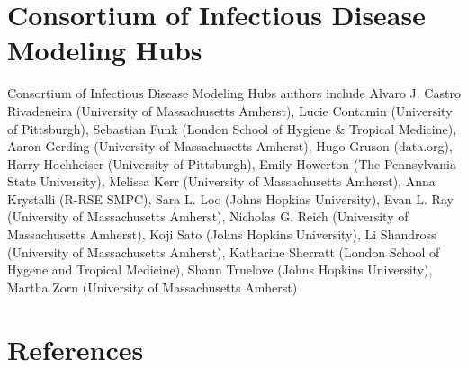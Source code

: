 \documentclass[
]{article}
\begin{document}
\section*{Consortium of Infectious Disease Modeling
Hubs}\label{consortium-of-infectious-disease-modeling-hubs}

Consortium of Infectious Disease Modeling Hubs authors include Alvaro J.
Castro Rivadeneira (University of Massachusetts Amherst), Lucie Contamin
(University of Pittsburgh), Sebastian Funk (London School of Hygiene \&
Tropical Medicine), Aaron Gerding (University of Massachusetts Amherst),
Hugo Gruson (data.org), Harry Hochheiser (University of Pittsburgh),
Emily Howerton (The Pennsylvania State University), Melissa Kerr
(University of Massachusetts Amherst), Anna Krystalli (R-RSE SMPC), Sara
L. Loo (Johns Hopkins University), Evan L. Ray (University of
Massachusetts Amherst), Nicholas G. Reich (University of Massachusetts
Amherst), Koji Sato (Johns Hopkins University), Li Shandross (University
of Massachusetts Amherst), Katharine Sherratt (London School of Hygene
and Tropical Medicine), Shaun Truelove (Johns Hopkins University),
Martha Zorn (University of Massachusetts Amherst)

\section*{References}\label{references}
\end{document}

